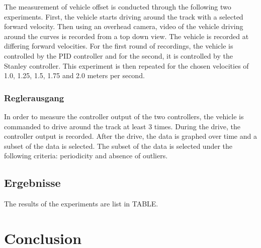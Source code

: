 \documentclass[arbeit=studie,oneside,BCOR=12mm]{ArbeitRST}
\begin{document}
The measurement of vehicle offset is conducted through the following two
experiments. First, the vehicle starts driving around the track with a selected
forward velocity. Then using an overhead camera, video of the vehicle driving
around the curves is recorded from a top down view. The vehicle is recorded at
differing forward velocities. For the first round of recordings, the vehicle is
controlled by the PID controller and for the second, it is controlled by the
Stanley controller. This experiment is then repeated for the chosen velocities
of 1.0, 1.25, 1.5, 1.75 and 2.0 meters per second.

\subsection{Reglerausgang}

In order to measure the controller output of the two controllers, the vehicle
is commanded to drive around the track at least 3 times. During the drive, the
controller output is recorded. After the drive, the data is graphed over time
and a subset of the data is selected. The subset of the data is selected under
the following criteria: periodicity and absence of outliers.

\section{Ergebnisse}

The results of the experiments are list in TABLE. 


\chapter{Conclusion}
\end{document}
